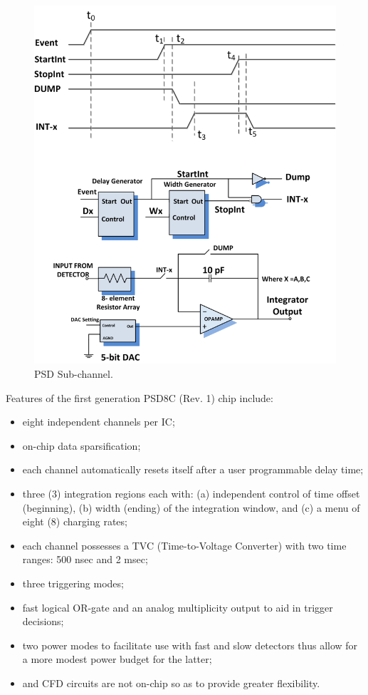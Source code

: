 \documentclass[12pt,oneside,final]{siuethesis}
\theoremstyle{definition}
\begin{document}
\begin{figure}[htbp!]
	\centering
 	\includegraphics[scale=1.3,keepaspectratio=true]{./ch1_figures/PSD_sub_channel.png}
 	\caption{PSD Sub-channel.}
 	\label{FIG:PSD_SUB_CHANNEL}
\end{figure}

Features of the first generation PSD8C (Rev. 1) chip include:
\begin{itemize}
\item
eight independent channels per IC;
\item
on-chip data sparsification;
\item
each channel automatically resets itself after a user programmable delay time;
\item
three (3) integration regions each with: (a) independent
control of time offset (beginning), (b) width (ending) of the
integration window, and (c) a menu of eight (8) charging rates;
\item
each channel possesses a TVC (Time-to-Voltage Converter) with two time ranges: 500 nsec and 2 msec;
\item
three triggering modes;
\item
fast logical OR-gate and an analog multiplicity output to aid in
trigger decisions;
\item
two power modes to facilitate use with fast and slow detectors
thus allow for a more modest power budget for the
latter; 
\item
and CFD circuits are not on-chip so as to provide greater flexibility.
\end{itemize}
\end{document}

